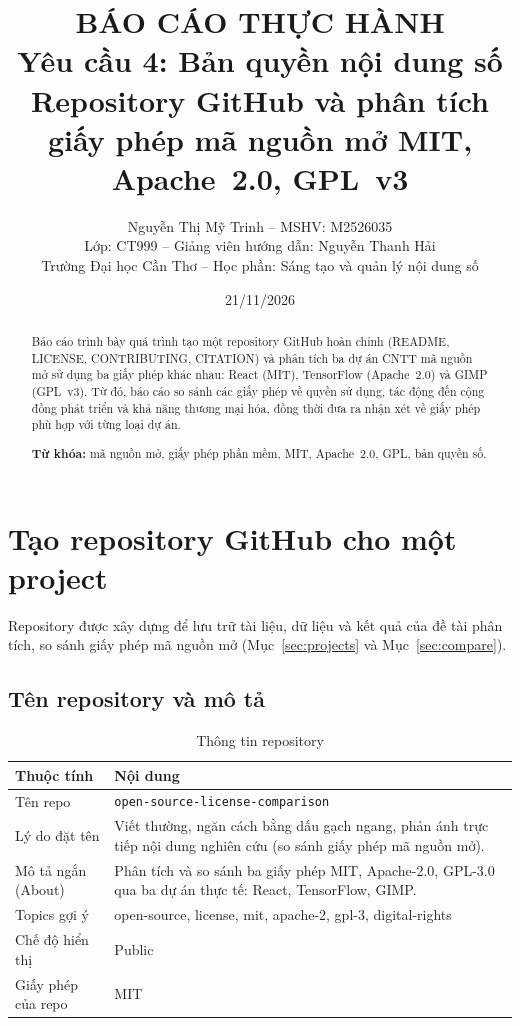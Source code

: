 \documentclass[12pt,a4paper]{article}
\title{\textbf{BÁO CÁO THỰC HÀNH\\[4pt] Yêu cầu 4: Bản quyền nội dung số}\\[6pt]
\large Repository GitHub và phân tích giấy phép mã nguồn mở MIT, Apache~2.0, GPL~v3}
\author{Nguyễn Thị Mỹ Trinh -- MSHV: M2526035\\
Lớp: CT999 -- Giảng viên hướng dẫn: Nguyễn Thanh Hải\\[4pt]
Trường Đại học Cần Thơ -- Học phần: Sáng tạo và quản lý nội dung số}
\date{21/11/2026}
\newcommand{\fn}[1]{\texttt{#1}}
\begin{document}
\maketitle

\begin{abstract}
Báo cáo trình bày quá trình tạo một repository GitHub hoàn chỉnh (README, LICENSE, CONTRIBUTING, CITATION) và phân tích ba dự án CNTT mã nguồn mở sử dụng ba giấy phép khác nhau: React (MIT), TensorFlow (Apache~2.0) và GIMP (GPL~v3). Từ đó, báo cáo so sánh các giấy phép về quyền sử dụng, tác động đến cộng đồng phát triển và khả năng thương mại hóa, đồng thời đưa ra nhận xét về giấy phép phù hợp với từng loại dự án.

\medskip\noindent\textbf{Từ khóa:} mã nguồn mở, giấy phép phần mềm, MIT, Apache~2.0, GPL, bản quyền số.
\end{abstract}

\tableofcontents
\newpage

\section{Tạo repository GitHub cho một project}\label{sec:repo}
Repository được xây dựng để lưu trữ tài liệu, dữ liệu và kết quả của đề tài phân tích, so sánh giấy phép mã nguồn mở (Mục~\ref{sec:projects} và Mục~\ref{sec:compare}).

\subsection{Tên repository và mô tả}\label{sec:repo-name}
\begin{table}[htbp]
\centering
\caption{Thông tin repository}\label{tab:repo}
\renewcommand{\arraystretch}{1.25}
\begin{tabularx}{\textwidth}{@{}l X@{}}
\toprule
\textbf{Thuộc tính} & \textbf{Nội dung}\\\midrule
Tên repo & \fn{open-source-license-comparison}\\
Lý do đặt tên & Viết thường, ngăn cách bằng dấu gạch ngang, phản ánh trực tiếp nội dung nghiên cứu (so sánh giấy phép mã nguồn mở).\\
Mô tả ngắn (About) & Phân tích và so sánh ba giấy phép MIT, Apache-2.0, GPL-3.0 qua ba dự án thực tế: React, TensorFlow, GIMP.\\
Topics gợi ý & open-source, license, mit, apache-2, gpl-3, digital-rights\\
Chế độ hiển thị & Public\\
Giấy phép của repo & MIT\\\bottomrule
\end{tabularx}
\end{table}
\end{document}
